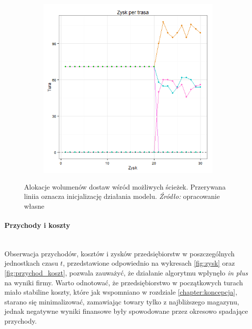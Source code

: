 \documentclass[polish, twoside, 12pt, a4paper]{article}
\theoremstyle{definition}
\theoremstyle{plain}
\theoremstyle{remark}
\begin{document}
\begin{figure}[hbt]
  \centering

  \begin{subfigure}[t]{0.45\textwidth}
    \includegraphics[width=\textwidth]{pictures/trasy.png}
  \end{subfigure}

  \captionsetup{margin=10pt,font=small,labelfont=bf,width=.8\textwidth}

  \caption[Alokacje wolumenów dostaw wśród możliwych ścieżek]{Alokacje wolumenów dostaw wśród możliwych ścieżek. Przerywana liniia oznacza inicjalizację działania modelu. \textit{Źródło:} opracowanie własne}\label{fig:sciezki}
\end{figure}


\paragraph{Przychody i koszty} \mbox{}\\

Obserwacja przychodów, kosztów i zysków przedsiębiorstw w poszczególnych jednostkach czasu $t$, przedstawione odpowiednio na wykresach \ref{fig:zysk} oraz \ref{fig:przychod_koszt}, pozwala zauważyć, że działanie algorytmu wpłynęło \textit{in plus} na wyniki firmy. Warto odnotować, że przedsiębiorstwo w początkowych turach miało stabiline koszty, które jak wspomniano w rozdziale \ref{chapter:koncepcja}, starano się minimalizować, zamawiając towary tylko z najbliższego magazynu, jednak negatywne wyniki finansowe były spowodowane przez okresowo spadające przychody. 
\end{document}
